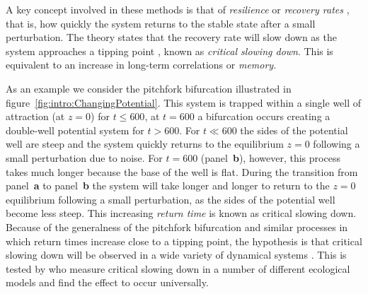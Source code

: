 A key concept involved in these methods is that of \emph{resilience} or \emph{recovery rates} \citep{scheffer2001, dakos2012}, that is, how quickly the system returns to the stable state after a small perturbation. The theory states that the recovery rate will slow down as the system approaches a tipping point \citep{scheffer2009}, known as \emph{critical slowing down}. This is equivalent to an increase in long-term correlations or \emph{memory}. {}

As an example we consider the pitchfork bifurcation illustrated in figure~\ref{fig:intro:ChangingPotential}.
This system is trapped within a single well of attraction (at $z=0$) for $t\leq 600$, at $t=600$ a bifurcation occurs creating a double-well potential system for $t>600$. For $t\ll 600$ the sides of the potential well are steep and the system quickly returns to the equilibrium $z=0$ following a small perturbation due to noise. For $t=600$ (panel~\textbf{b}), however, this process takes much longer because the base of the well is flat. During the transition from panel~\textbf{a} to panel~\textbf{b} the system will take longer and longer to return to the $z=0$ equilibrium following a small perturbation, as the sides of the potential well become less steep. This increasing \textit{return time} is known as critical slowing down.
Because of the generalness of the pitchfork bifurcation and similar processes \citep{kuehn2011mathematical} in which return times increase close to a tipping point, the hypothesis is that critical slowing down will be observed in a wide variety of dynamical systems \citep{scheffer2009}. This is tested by \cite{van2007} who measure critical slowing down in a number of different ecological models and find the effect to occur universally. 

